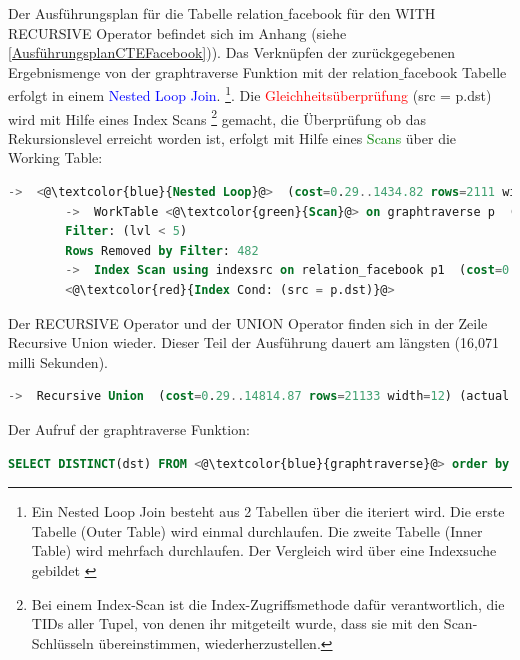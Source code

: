 Der Ausführungsplan für die Tabelle relation$\_$facebook für den WITH RECURSIVE Operator befindet sich im Anhang (siehe \ref{AusführungsplanCTEFacebook})).
Das Verknüpfen der zurückgegebenen Ergebnismenge von der graphtraverse Funktion mit der relation$\_$facebook Tabelle erfolgt in einem \textcolor{blue}{Nested Loop Join}.
\footnote{Ein Nested Loop Join besteht aus 2 Tabellen über die iteriert wird. Die erste Tabelle (Outer Table) wird einmal durchlaufen. Die zweite
Tabelle (Inner Table) wird mehrfach durchlaufen. Der Vergleich wird über eine Indexsuche gebildet \cite[Seite 213]{froehlich01}}. Die \textcolor{red}{Gleichheitsüberprüfung} (src = p.dst)
wird mit Hilfe eines Index Scans \footnote{Bei einem Index-Scan ist die Index-Zugriffsmethode dafür verantwortlich, die \ac{TID}s aller Tupel, von denen ihr mitgeteilt wurde,
dass sie mit den Scan-Schlüsseln übereinstimmen, wiederherzustellen.} gemacht,
die Überprüfung ob das Rekursionslevel erreicht worden ist, erfolgt mit Hilfe eines \textcolor{green}{Scans} über die Working Table:
\begin{lstlisting}[language=SQL,caption = Überprüfung der WHERE Bedingung,frame=single, label={WhereConditionCTE} ]
    ->  <@\textcolor{blue}{Nested Loop}@>  (cost=0.29..1434.82 rows=2111 width=12) (actual time=0.018..2.174 rows=8173 loops=5)
        ->  WorkTable <@\textcolor{green}{Scan}@> on graphtraverse p  (cost=0.00..5.17 rows=77 width=8) (actual time=0.016..0.065 rows=729 loops=5)
        Filter: (lvl < 5)
        Rows Removed by Filter: 482
        ->  Index Scan using indexsrc on relation_facebook p1  (cost=0.29..18.23 rows=27 width=8) (actual time=0.001..0.002 rows=11 loops=3645)
        <@\textcolor{red}{Index Cond: (src = p.dst)}@>
\end{lstlisting}
Der RECURSIVE Operator und der UNION Operator finden sich in der Zeile Recursive Union wieder. Dieser Teil der Ausführung dauert am längsten (16,071 milli Sekunden).
\begin{lstlisting}[language=SQL,caption = Aufruf RECURSIVE und UNION Operator,frame=single, label={WhereConditionCTE} ]
    ->  Recursive Union  (cost=0.29..14814.87 rows=21133 width=12) (actual time=0.014..16.085 rows=6056 loops=1)
\end{lstlisting}
Der Aufruf der graphtraverse Funktion:
\begin{lstlisting}[language=SQL,caption = Aufruf der graphtraverse Funktion,frame=single, label={WhereConditionCTE} ]
    SELECT DISTINCT(dst) FROM <@\textcolor{blue}{graphtraverse}@> order by dst
\end{lstlisting}
